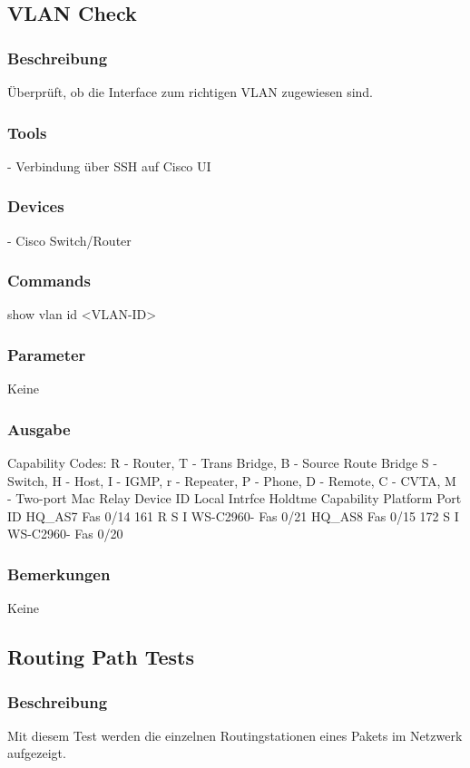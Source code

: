 \documentclass[a4,12pt]{scrartcl}
\begin{document}
\subsection{VLAN Check}
\subsubsection{Beschreibung}
Überprüft, ob die Interface zum richtigen VLAN zugewiesen sind.
\subsubsection{Tools}
- Verbindung über SSH auf Cisco UI
\subsubsection{Devices}
- Cisco Switch/Router
\subsubsection{Commands}
show vlan id <VLAN-ID>
\subsubsection{Parameter}
Keine
\subsubsection{Ausgabe}
Capability Codes: R - Router, T - Trans Bridge, B - Source Route Bridge\newline
                  S - Switch, H - Host, I - IGMP, r - Repeater, P - Phone,\newline
                  D - Remote, C - CVTA, M - Two-port Mac Relay\newline
Device ID        Local Intrfce     Holdtme    Capability  Platform  Port ID\newline
HQ_AS7           Fas 0/14          161             R S I  WS-C2960- Fas 0/21\newline
HQ_AS8           Fas 0/15          172              S I   WS-C2960- Fas 0/20\newline
\subsubsection{Bemerkungen}
Keine

\subsection{Routing Path Tests}
\subsubsection{Beschreibung}
Mit diesem Test werden die einzelnen Routingstationen eines Pakets im Netzwerk aufgezeigt. 
\end{document}

